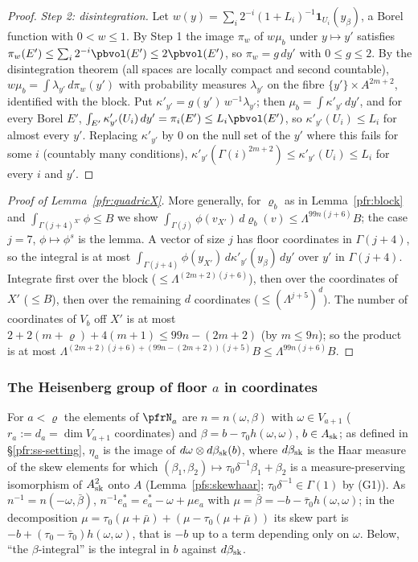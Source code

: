 \documentclass[10pt]{amsart}
\theoremstyle{definition}
\theoremstyle{remark}
\begin{document}
\begin{proof}
\emph{Step 2: disintegration.} Let $w(y)=\sum_i2^{-i}(1+L_i)^{-1}\mathbf 1_{U_i}(y_\beta)$, a Borel function with
$0<w\le1$. By Step 1 the image $\pi_w$ of $w\mu_b$ under $y\mapsto y'$ satisfies $\pi_w(E')\le\sum_i2^{-i}\pbvol(E')
\le2\pbvol(E')$, so $\pi_w=g\,dy'$ with $0\le g\le2$. By the disintegration theorem (all spaces are locally compact
and second countable), $w\mu_b=\int\lambda_{y'}\,d\pi_w(y')$ with probability measures $\lambda_{y'}$ on the fibre
$\{y'\}\times A^{2m+2}$, identified with the block. Put $\kappa'_{y'}=g(y')\,w^{-1}\lambda_{y'}$; then
$\mu_b=\int\kappa'_{y'}\,dy'$, and for every Borel $E'$, $\int_{E'}\kappa'_{y'}(U_i)\,dy'=\pi_i(E')\le L_i\pbvol(E')$, so
$\kappa'_{y'}(U_i)\le L_i$ for almost every $y'$. Replacing $\kappa'_{y'}$ by $0$ on the null set of the $y'$ where
this fails for some $i$ (countably many conditions), $\kappa'_{y'}(\Gamma(i)^{2m+2})\le\kappa'_{y'}(U_i)\le L_i$ for
every $i$ and $y'$.
\end{proof}

\begin{proof}[Proof of Lemma~\ref{pfr:quadricX}]
More generally, for $\varrho_b$ as in Lemma~\ref{pfr:block} and $\int_{\Gamma(j+4)^{X'}}\phi\le B$ we show
$\int_{\Gamma(j)}\phi(v_{X'})\,\allowbreak d\varrho_b(v)\le\Lambda^{99n(j+6)}B$; the case $j=7$, $\phi\mapsto\phi^s$ is the lemma. A
vector of size $j$ has floor coordinates in $\Gamma(j+4)$, so the integral is at most
$\int_{\Gamma(j+4)}\phi(y_{X'})\,d\kappa'_{y'}(y_\beta)\,dy'$ over $y'$ in $\Gamma(j+4)$. Integrate first over the block
($\le\Lambda^{(2m+2)(j+6)}$), then over the coordinates of $X'$ ($\le B$), then over the remaining $d$ coordinates
($\le(\Lambda^{j+5})^d$). The number of coordinates of $V_b$ off $X'$ is at most $2+2(m+\varrho)+4(m+1)\le99n-(2m+2)$
(by $m\le9n$); so the product is at most $\Lambda^{(2m+2)(j+6)+(99n-(2m+2))(j+5)}B\le\Lambda^{99n(j+6)}B$.
\end{proof}

\subsubsection*{The Heisenberg group of floor $a$ in coordinates}
For $a<\varrho$ the elements of $\pfrN_a$ are $n=n(\omega,\beta)$ with $\omega\in V_{a+1}$ ($r_a:=d_a=\dim V_{a+1}$
coordinates) and $\beta=b-\tau_0h(\omega,\omega)$, $b\in A_{\rm sk}$; as defined in \S\ref{pfr:ss-setting}, $\eta_a$ is
the image of $d\omega\otimes d\beta_{\rm sk}(b)$, where $d\beta_{\rm sk}$ is the Haar measure of the skew elements for which
$(\beta_1,\beta_2)\mapsto\tau_0\delta^{-1}\beta_1+\beta_2$ is a measure-preserving isomorphism of $A_{\rm sk}^2$ onto $A$
(Lemma~\ref{pfs:skewhaar}; $\tau_0\delta^{-1}\in\Gamma(1)$ by (G1)). As $n^{-1}=n(-\omega,\bar\beta)$,
$n^{-1}e_a^*=e_a^*-\omega+\mu e_a$ with $\mu=\bar\beta=-b-\bar\tau_0h(\omega,\omega)$; in the decomposition $\mu=\tau_0(\mu+\bar\mu)
+(\mu-\tau_0(\mu+\bar\mu))$ its skew part is $-b+(\tau_0-\bar\tau_0)h(\omega,\omega)$, that is $-b$ up to a term depending only
on $\omega$. Below, ``the $\beta$-integral'' is the integral in $b$ against $d\beta_{\rm sk}$.
\end{document}
